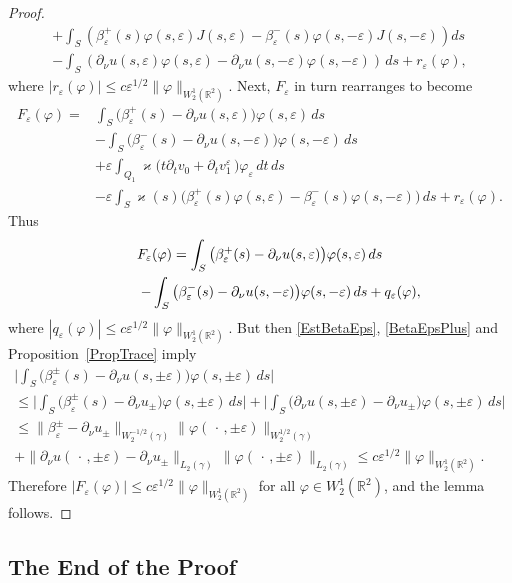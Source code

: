 \documentclass[reqno]{amsart}
\theoremstyle{plain}
\numberwithin{equation}{section}
\renewcommand{\kappa}{\varkappa}
\newcommand{\Real}{\mathbb R}
\newcommand{\eps}{\varepsilon}
\renewcommand{\phi}{\varphi}
\renewcommand{\leq}{\leqslant}
\begin{document}
\begin{proof}
\begin{multline*}
+\int_S\left(\beta_\eps^+(s)\phi(s,\eps)J(s,\eps)
-\beta_\eps^-(s)\phi(s,-\eps)J(s,-\eps)\right)ds
\\
-\int_S (\partial_\nu u(s,\eps)\phi(s,\eps)-\partial_\nu u(s,-\eps)\phi(s,-\eps) )\,ds+r_\eps(\phi),
\end{multline*}
where $|r_\eps(\phi)|\leq c\eps^{1/2}\|\phi\|_{W_2^1(\Real^2)}$.
Next, $F_\eps$ in turn rearranges to become
\begin{align*}
F_\eps(\phi)=&\int_S \big(\beta_\eps^+(s)-\partial_\nu u(s,\eps)\big)\phi(s,\eps)\,ds\\
&-\int_S \big(\beta_\eps^-(s)-\partial_\nu u(s,-\eps)\big)\phi(s,-\eps)\,ds\\
&+\eps \int_{Q_1}\kappa\big( t\partial_t v_0+\partial_t v_1^\eps\,\big)\phi_\eps \,dt\, ds\\
&-\eps \int_S \kappa(s)\big(\beta_\eps^+(s)\phi(s,\eps)
-\beta_\eps^-(s)\phi(s,-\eps)\big)\,ds+r_\eps(\phi).
\end{align*}
Thus
\begin{multline*}
F_\eps(\phi)
=\int_S \big(\beta_\eps^+(s)-\partial_\nu u(s,\eps)\big)\phi(s,\eps)\,ds\\
\kern30pt-\int_S \big(\beta_\eps^-(s)-\partial_\nu u(s,-\eps)\big)\phi(s,-\eps)\,ds+q_\eps(\phi),
\end{multline*}
where $|q_\eps(\phi)|\leq c\eps^{1/2}\|\phi\|_{W_2^1(\Real^2)}$.
But then \eqref{EstBetaEps}, \eqref{BetaEpsPlus} and Proposition~\ref{PropTrace} imply
\begin{multline*}
\bigg|\int_S \big(\beta_\eps^\pm(s)-\partial_\nu u(s,\pm\eps)\big)\phi(s,\pm\eps)\,ds\bigg|\\
\leq\bigg|\int_S \big(\beta_\eps^\pm(s)-\partial_\nu u_\pm\big)\phi(s,\pm\eps)\,ds\bigg|+
\bigg|\int_S \big(\partial_\nu u(s,\pm\eps)-\partial_\nu u_\pm\big)\phi(s,\pm\eps)\,ds\bigg|
\\\leq \|\beta_\eps^\pm-\partial_\nu u_\pm\|_{W_2^{-1/2}(\gamma)} \|\phi(\,\cdot\,,\pm\eps)\|_{W_2^{1/2}(\gamma)}\\+\|\partial_\nu u(\,\cdot\,,\pm\eps)-\partial_\nu u_\pm\|
_{L_2(\gamma )}\,\|\phi(\,\cdot\,,\pm\eps)\|_{L_2(\gamma)}\leq c\eps^{1/2} \|\phi\|_{W_2^1(\Real^2)}.
\end{multline*}
Therefore $|F_\eps(\phi)|\leq c\eps^{1/2}\|\phi\|_{W_2^1(\Real^2)}$
for all $\phi\in W_2^1(\Real^2)$, and the lemma follows.
\end{proof}



\subsection{The End of the Proof}
\end{document}
